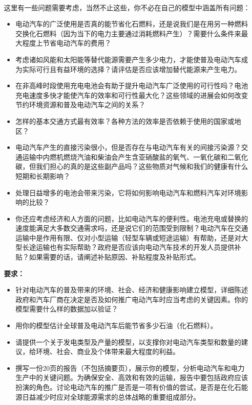 \documentclass[bwprint]{cumcmthesis}
\begin{document}
\begin{shaded}
{\small\ 

\noindent 这里有一些问题需要考虑，当然不止这些，你不必在自己的模型中涵盖所有问题：

\begin{itemize}
\item 电动汽车的广泛使用是否真的能节省化石燃料，还是说我们是在用另一种燃料交换化石燃料（因为当下的电力主要通过消耗燃料产生）？需要什么条件来最大程度上节省电动汽车的费用？
\item 考虑诸如风能和太阳能等替代能源需要产生多少电力，才能使普及电动汽车成为实际可行且有益环境的选择？请评估是否应该增加替代能源来产生电力。
\item 在非高峰时段使用充电电池会有助于提升电动汽车广泛使用的可行性吗？电池充电速度多快才能使汽车的效率和可行性最大化？这些领域的进展会如何改变节约环境资源和普及电动汽车之间的关系？
\item 怎样的基本交通方式最有效率？各种方法的效率是否依赖于使用的国家或地区？
\item 电动汽车产生的直接污染很小，但是否存在与电动汽车有关的间接污染源？交通运输中内燃机燃烧汽油和柴油会产生含亚硝酸盐的氧气、一氧化碳和二氧化碳，但我们担心的真的是这些副产品吗？这些物质对气候和我们的健康有什么短期和长期影响？
\item 处理日益增多的电池会带来污染，它将如何影响电动汽车和燃料汽车对环境影响的比较？
\item 你还应考虑经济和人方面的问题，比如电动汽车的便利性。电池充电或替换的速度能满足大多数交通需求吗，还是说它们的范围受到限制？电动汽车在交通运输中是作用有限、仅对小型运输（轻型车辆或短途运输）有帮助，还是对大型长途运输也有实际帮助？政府是否应该向电动汽车技术的开发人员提供补贴？如果需要的话，请阐述补贴原因、补贴程度及补贴形式。
\end{itemize}

\noindent\textbf{要求：}

\begin{itemize}
\item 针对电动汽车的普及带来的环境、社会、经济和健康影响建立模型，详细陈述政府和汽车厂商在决定是否及如何推广电动汽车时应当考虑的关键因素。你的模型需要什么样的数据加以验证？
\item 用你的模型估计全球普及电动汽车后能节省多少石油（化石燃料）。
\item 请提供一个关于发电类型及产量的模型，以支撑你对电动汽车类型和数量的建议，给环境、社会、商业及个体带来最大程度的利益。
\item 撰写一份20页的报告（不包括摘要页），展示你的模型，分析电动汽车和电力生产中的关键问题。为确保安全、高效和有效的运输，报告中要包括政府应该扮演的角色。讨论电动汽车的推广是否是一项有价值的尝试，是否是在化石能源日益减少时应对全球能源需求的总体战略的重要组成部分。
\end{itemize}

}

\end{shaded}
\end{document}
